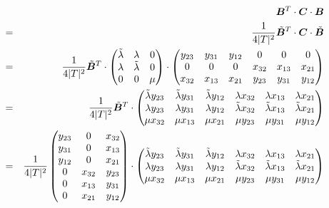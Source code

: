 \begin{landscape}
\begin{eqnarray}
&&
{\bm B}^T \cdot {\bm C} \cdot {\bm B} \nn\\
&=& \frac{1}{4|T|^2} \tilde{\bm B}^T \cdot {\bm C} \cdot \tilde{\bm B} \nn\\
&=& \frac{1}{4|T|^2} \tilde{\bm B}^T \cdot 
\begin{pmatrix}
\tilde\lambda  & \lambda & 0 \\
\lambda & \tilde\lambda  & 0 \\
0 & 0 & \mu
\end{pmatrix}
\cdot 
\begin{pmatrix}
y_{23}  & y_{31}  & y_{12} & 0 & 0 & 0 \\
0 & 0 & 0 & x_{32}  & x_{13}  & x_{21} \\
x_{32} & x_{13} & x_{21} & y_{23} &  y_{31}  & y_{12}
\end{pmatrix} \nn\\
&=& \frac{1}{4|T|^2} \tilde{\bm B}^T \cdot 
\begin{pmatrix}
\tilde\lambda y_{23} & \tilde\lambda y_{31} & \tilde\lambda y_{12} & \lambda x_{32} & \lambda x_{13} & \lambda x_{21} \\
\lambda y_{23} &  \lambda y_{31} &  \lambda y_{12} & \tilde\lambda x_{32} & \tilde\lambda x_{13} & \tilde\lambda x_{21} \\
\mu x_{32} &    \mu x_{13} & \mu x_{21} & \mu y_{23} &    \mu y_{31} & \mu y_{12}  
\end{pmatrix} \nn\\
&=&
\frac{1}{4|T|^2} 
\begin{pmatrix}
y_{23} & 0 & x_{32} \\
y_{31} & 0 & x_{13} \\
y_{12} & 0 & x_{21} \\
0 & x_{32} & y_{23} \\
0 & x_{13} & y_{31} \\
0 & x_{21} & y_{12} 
\end{pmatrix}
\cdot
\begin{pmatrix}
\tilde\lambda y_{23} & \tilde\lambda y_{31} & \tilde\lambda y_{12} & \lambda x_{32} & \lambda x_{13} & \lambda x_{21} \\
\lambda y_{23} &  \lambda y_{31} &  \lambda y_{12} & \tilde\lambda x_{32} & \tilde\lambda x_{13} & \tilde\lambda x_{21} \\
\mu x_{32} &    \mu x_{13} & \mu x_{21} & \mu y_{23} &    \mu y_{31} & \mu y_{12}  
\end{pmatrix} \nn\\

\end{eqnarray}
\end{landscape}
